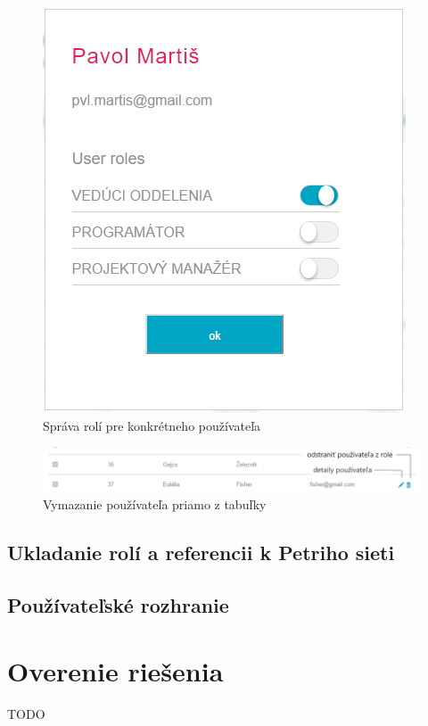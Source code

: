 \begin{figure}[h]
	\centering
	\includegraphics[width=0.5\linewidth]{images/user_detail_screen}
	\caption{ Správa rolí pre konkrétneho používateľa  }
	\label{fig:user_detail_screen}
\end{figure}

\begin{figure}[h]
	\centering
	\includegraphics[width=1\linewidth]{images/one_user_screen2}
	\caption{ Vymazanie používateľa priamo z tabuľky  }
	\label{fig:user_detail_screen}
\end{figure}



\subsection{Ukladanie rolí a referencii k Petriho sieti}




\subsection{Používateľské rozhranie}



\section{Overenie riešenia}
TODO
